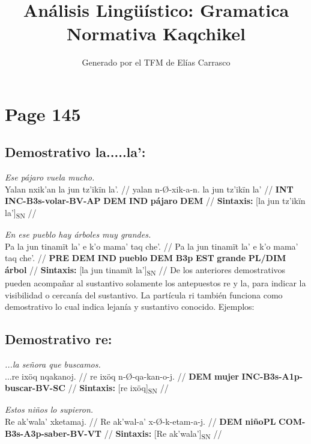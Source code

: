 \documentclass{article}%
\title{Análisis Lingüístico: Gramatica Normativa Kaqchikel}%
\author{Generado por el TFM de Elías Carrasco}%
\begin{document}
%
\normalsize%
\maketitle%
\section{Page 145}%
\label{sec:Page145}%
\subsection{Demostrativo la.....la':}%
\label{subsec:Demostrativola.....la}%

%
\par\medskip%
\ex
\textit{Ese pájaro vuela mucho.} \\
\begingl
\gla Yalan nxik'an la jun tz'ikïn la'. //
\glb yalan n-Ø-xik-a-n. la jun tz'ikïn la' //
\glc \textbf{INT} \textbf{INC-}\textbf{B3s-}\textbf{volar-}\textbf{BV-}\textbf{AP} \textbf{DEM} \textbf{IND} \textbf{pájaro} \textbf{DEM} //
\glft \textbf{Sintaxis:} [la jun tz'ikïn la']\textsubscript{SN} //
\endgl
\xe
%
\medskip%
\par\medskip%
\ex
\textit{En ese pueblo hay árboles muy grandes.} \\
\begingl
\gla Pa la jun tinamït la' e k'o mama' taq che'. //
\glb Pa la jun tinamït la' e k'o mama' taq che'. //
\glc \textbf{PRE} \textbf{DEM} \textbf{IND} \textbf{pueblo} \textbf{DEM} \textbf{B3p} \textbf{EST} \textbf{grande} \textbf{PL/DIM} \textbf{árbol} //
\glft \textbf{Sintaxis:} [la jun tinamït la']\textsubscript{SN} //
\endgl
\xe
%
\medskip%
De los anteriores demostrativos pueden acompañar al sustantivo solamente los %
antepuestos re y la, para indicar la visibilidad o cercanía del sustantivo. La partícula ri %
también funciona como demostrativo lo cual indica lejanía y sustantivo conocido. %
Ejemplos: %
\subsection{Demostrativo re:}%
\label{subsec:Demostrativore}%

%
\par\medskip%
\ex
\textit{...la señora que buscamos.} \\
\begingl
\gla ...re ixöq nqakanoj. //
\glb re ixöq n-Ø-qa-kan-o-j. //
\glc \textbf{DEM} \textbf{mujer} \textbf{INC-}\textbf{B3s-}\textbf{A1p-}\textbf{buscar-}\textbf{BV-}\textbf{SC} //
\glft \textbf{Sintaxis:} [re ixöq]\textsubscript{SN} //
\endgl
\xe
%
\medskip%
\par\medskip%
\ex
\textit{Estos niños lo supieron.} \\
\begingl
\gla Re ak'wala' xketamaj. //
\glb Re ak'wal-a' x-Ø-k-etam-a-j. //
\glc \textbf{DEM} \textbf{niño}\textbf{PL} \textbf{COM-}\textbf{B3s-}\textbf{A3p-}\textbf{saber-}\textbf{BV-}\textbf{VT} //
\glft \textbf{Sintaxis:} [Re ak'wala']\textsubscript{SN} //
\endgl
\xe
%
\medskip%
\end{document}
